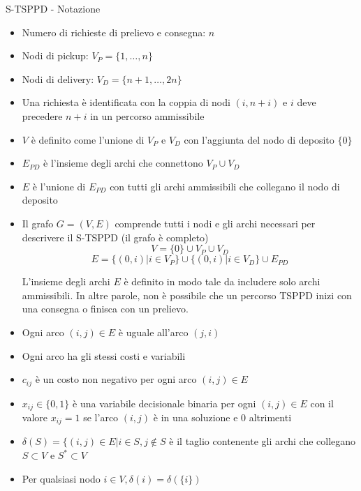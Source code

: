 \documentclass[9pt]{beamer}
\begin{document}
\begin{frame}[allowframebreaks]{S-TSPPD - Notazione}
	\begin{itemize}
		\item
		Numero di richieste di prelievo e consegna: $n$
		
		\item
		Nodi di pickup: $V_P = \{1, \dots, n\}$
		
		\item
		Nodi di delivery: $V_D = \{n+1, \dots, 2n\}$
		
		\item
		Una richiesta è identificata con la coppia di nodi $(i,n+i)$ e $i$ deve precedere $n+i$ in un percorso ammissibile
		
		\item
		$V$ è definito come l'unione di $V_P$ e $V_D$ con l'aggiunta del nodo di deposito $\{0\}$
		
		\item
		$E_{PD}$ è l'insieme degli archi che connettono $V_P \cup V_D$
	
		\item
		$E$ è l'unione di $E_{PD}$ con tutti gli archi ammissibili che collegano il nodo di deposito
		
		\item
		Il grafo $G=(V,E)$ comprende tutti i nodi e gli archi necessari per descrivere il S-TSPPD (il grafo è completo)
		\[ V=\{0\} \cup V_P \cup V_D \]
		\[ E = \{ (0,i) | i \in V_P \} \cup \{ (0,i) | i \in V_D \} \cup E_{PD} \]
		
		L'insieme degli archi $E$ è definito in modo tale da includere solo archi ammissibili.
		In altre parole, non è possibile che un percorso TSPPD inizi con una consegna o finisca con un prelievo.
		
		\item
		Ogni arco $(i,j) \in E$ è uguale all'arco $(j, i)$

		\item
		Ogni arco ha gli stessi costi e variabili

		\item
		$c_{ij}$ è un costo non negativo per ogni arco $(i,j) \in E$

		\item
		$x_{ij} \in \{ 0, 1 \}$ è una variabile decisionale binaria per ogni $(i, j) \in E$ con il valore $x_{ij} = 1$ se l'arco $(i, j)$ è in una soluzione e $0$ altrimenti

		\item
		$\delta(S) = \{ (i, j) \in E | i \in S, j \notin S$ è il taglio contenente gli archi che collegano $S \subset V$ e $S^* \subset V$ 

		\item
		Per qualsiasi nodo $i \in V, \delta(i) = \delta( \{ i \})$
	\end{itemize}
\end{frame}
\end{document}
